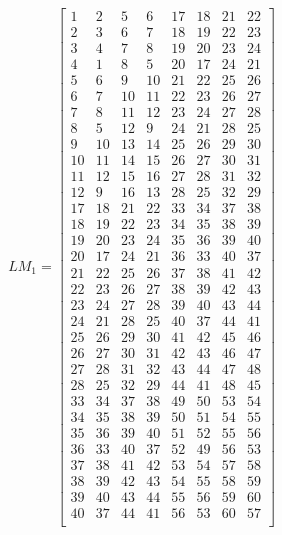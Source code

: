 \documentclass[10pt]{article}
\begin{document}
\begin{equation}
LM_1=
\begin{bmatrix}
1 & 2 & 5 & 6 & 17 & 18 & 21 & 22\\
2 & 3 & 6 & 7 & 18 & 19 & 22 & 23\\
3 & 4 & 7 & 8 & 19 & 20 & 23 & 24\\
4 & 1 & 8 & 5 & 20 & 17 & 24 & 21\\
5 & 6 & 9 & 10 & 21 & 22 & 25 & 26\\
6 & 7 & 10 & 11 & 22 & 23 & 26 & 27\\
7 & 8 & 11 & 12 & 23 & 24 & 27 & 28\\
8 & 5 & 12 & 9 & 24 & 21 & 28 & 25\\
9 & 10 & 13 & 14 & 25 & 26 & 29 & 30\\
10 & 11 & 14 & 15 & 26 & 27 & 30 & 31\\
11 & 12 & 15 & 16 & 27 & 28 & 31 & 32\\
12 & 9 & 16 & 13 & 28 & 25 & 32 & 29\\
17 & 18 & 21 & 22 & 33 & 34 & 37 & 38\\
18 & 19 & 22 & 23 & 34 & 35 & 38 & 39\\
19 & 20 & 23 & 24 & 35 & 36 & 39 & 40\\
20 & 17 & 24 & 21 & 36 & 33 & 40 & 37\\
21 & 22 & 25 & 26 & 37 & 38 & 41 & 42\\
22 & 23 & 26 & 27 & 38 & 39 & 42 & 43\\
23 & 24 & 27 & 28 & 39 & 40 & 43 & 44\\
24 & 21 & 28 & 25 & 40 & 37 & 44 & 41\\
25 & 26 & 29 & 30 & 41 & 42 & 45 & 46\\
26 & 27 & 30 & 31 & 42 & 43 & 46 & 47\\
27 & 28 & 31 & 32 & 43 & 44 & 47 & 48\\
28 & 25 & 32 & 29 & 44 & 41 & 48 & 45\\
33 & 34 & 37 & 38 & 49 & 50 & 53 & 54\\
34 & 35 & 38 & 39 & 50 & 51 & 54 & 55\\
35 & 36 & 39 & 40 & 51 & 52 & 55 & 56\\
36 & 33 & 40 & 37 & 52 & 49 & 56 & 53\\
37 & 38 & 41 & 42 & 53 & 54 & 57 & 58\\
38 & 39 & 42 & 43 & 54 & 55 & 58 & 59\\
39 & 40 & 43 & 44 & 55 & 56 & 59 & 60\\
40 & 37 & 44 & 41 & 56 & 53 & 60 & 57\\

\end{bmatrix}
\end{equation}
\end{document}
